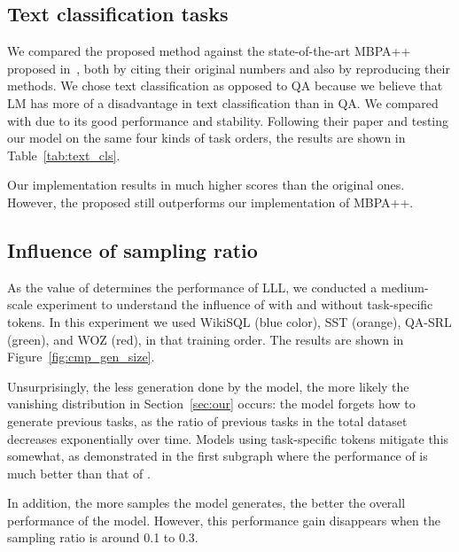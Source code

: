 \documentclass{article} \usepackage{iclr2020_conference,times}
\begin{document}
\subsection{Text classification tasks}
We compared the proposed method against the state-of-the-art MBPA++ proposed in~\citet{d2019episodic}, both by citing their original numbers and also by reproducing their methods.
We chose text classification as opposed to QA because we believe that LM has more of a disadvantage in text classification than in QA.
We compared with  due to its good performance and stability.
Following their paper and testing our model on the same four kinds of task orders, the results are shown in Table~\ref{tab:text_cls}.

Our implementation results in much higher scores than the original ones.
However, the proposed  still outperforms our implementation of MBPA++.







\subsection{Influence of sampling ratio }
As the value of  determines the performance of LLL,
we conducted a medium-scale experiment to understand the influence of  with and without task-specific tokens.
In this experiment we used WikiSQL (blue color), SST (orange), QA-SRL (green), and WOZ (red), in that training order.
The results are shown in Figure~\ref{fig:cmp_gen_size}.

Unsurprisingly, the less generation done by the model, the more likely the vanishing distribution in Section~\ref{sec:our} occurs: the model forgets how to generate previous tasks, as the ratio of previous tasks in the total dataset decreases exponentially over time. 
Models using task-specific tokens mitigate this somewhat, as demonstrated in the first subgraph where the performance of  is much better than that of .

In addition, the more samples the model generates, the better the overall performance of the model.
However, this performance gain disappears when the sampling ratio  is around 0.1 to 0.3.
\end{document}
